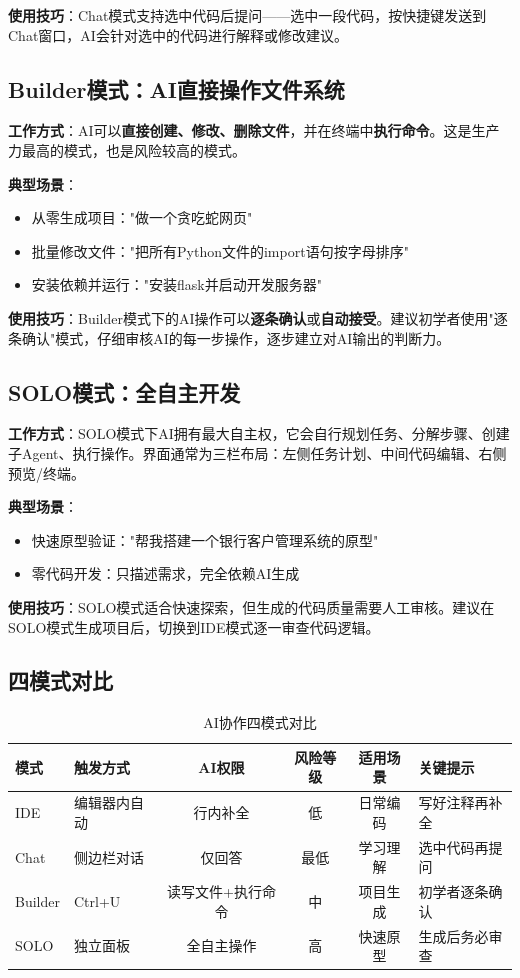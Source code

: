 \textbf{使用技巧}：Chat模式支持选中代码后提问——选中一段代码，按快捷键发送到Chat窗口，AI会针对选中的代码进行解释或修改建议。

\subsection{Builder模式：AI直接操作文件系统}

\textbf{工作方式}：AI可以\textbf{直接创建、修改、删除文件}，并在终端中\textbf{执行命令}。这是生产力最高的模式，也是风险较高的模式。

\textbf{典型场景}：
\begin{itemize}[leftmargin=2em]
  \item 从零生成项目："做一个贪吃蛇网页"
  \item 批量修改文件："把所有Python文件的import语句按字母排序"
  \item 安装依赖并运行："安装flask并启动开发服务器"
\end{itemize}

\textbf{使用技巧}：Builder模式下的AI操作可以\textbf{逐条确认}或\textbf{自动接受}。建议初学者使用"逐条确认"模式，仔细审核AI的每一步操作，逐步建立对AI输出的判断力。

\subsection{SOLO模式：全自主开发}

\textbf{工作方式}：SOLO模式下AI拥有最大自主权，它会自行规划任务、分解步骤、创建子Agent、执行操作。界面通常为三栏布局：左侧任务计划、中间代码编辑、右侧预览/终端。

\textbf{典型场景}：
\begin{itemize}[leftmargin=2em]
  \item 快速原型验证："帮我搭建一个银行客户管理系统的原型"
  \item 零代码开发：只描述需求，完全依赖AI生成
\end{itemize}

\textbf{使用技巧}：SOLO模式适合快速探索，但生成的代码质量需要人工审核。建议在SOLO模式生成项目后，切换到IDE模式逐一审查代码逻辑。

\subsection{四模式对比}

\begin{table}[H]
\centering
\begin{tabular}{llccc p{3cm}}
\toprule
\textbf{模式} & \textbf{触发方式} & \textbf{AI权限} & \textbf{风险等级} & \textbf{适用场景} & \textbf{关键提示} \\
\midrule
IDE & 编辑器内自动 & 行内补全 & 低 & 日常编码 & 写好注释再补全 \\
Chat & 侧边栏对话 & 仅回答 & 最低 & 学习理解 & 选中代码再提问 \\
Builder & Ctrl+U & 读写文件+执行命令 & 中 & 项目生成 & 初学者逐条确认 \\
SOLO & 独立面板 & 全自主操作 & 高 & 快速原型 & 生成后务必审查 \\
\bottomrule
\end{tabular}
\caption{AI协作四模式对比}
\end{table}


